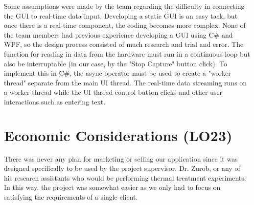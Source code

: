 \documentclass{article}
\begin{document}
 \noindent Some assumptions were made by the team regarding the difficulty in connecting the GUI to real-time data input. Developing a static GUI is an easy task, but once there is a real-time component, the coding becomes more complex. None of the team members had previous experience developing a GUI using C# and WPF, so the design process consisted of much research and trial and error. The function for reading in data from the hardware must run in a continuous loop but also be interruptable (in our case, by the "Stop Capture" button click). To implement this in C#, the async operator must be used to create a "worker thread" separate from the main UI thread. The real-time data streaming runs on a worker thread while the UI thread control button clicks and other user interactions such as entering text. 
 

\section{Economic Considerations (LO23)}


\noindent There was never any plan for marketing or selling our application since it was designed specifically to be used by the project supervisor, Dr. Zurob, or any of his research assistants who would be performing thermal treatment experiments. In this way, the project was somewhat easier as we only had to focus on satisfying the requirements of a single client. \\
\end{document}
